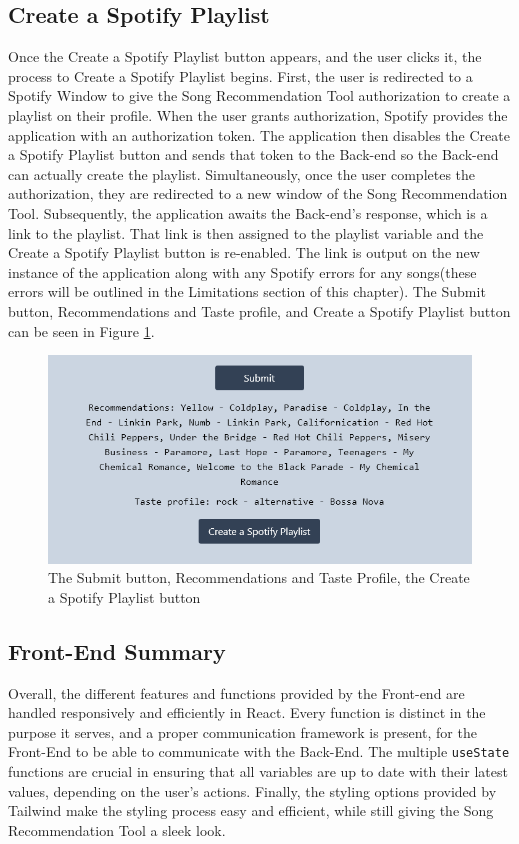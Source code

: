 \documentclass{l4proj}
\begin{document}
\subsection{Create a Spotify Playlist}
Once the Create a Spotify Playlist button appears, and the user clicks it, the process to Create a Spotify Playlist begins. First, the user is redirected to a Spotify Window to give the Song Recommendation Tool authorization to create a playlist on their profile. When the user grants authorization, Spotify provides the application with an authorization token. The application then disables the Create a Spotify Playlist button and sends that token to the Back-end so the Back-end can actually create the playlist. Simultaneously, once the user completes the authorization, they are redirected to a new window of the Song Recommendation Tool. Subsequently, the application awaits the Back-end's response, which is a link to the playlist. That link is then assigned to the playlist variable and the Create a Spotify Playlist button is re-enabled. The link is output on the new instance of the application along with any Spotify errors for any songs(these errors will be outlined in the Limitations section of this chapter). The Submit button, Recommendations and Taste profile, and Create a Spotify Playlist button can be seen in Figure \ref{fig:submit}.
\begin{figure}
    \centering
    \includegraphics[width=1\linewidth]{images/Submit.png}
    \caption{The Submit button, Recommendations and Taste Profile, the Create a Spotify Playlist button}
    \label{fig:submit}
\end{figure}
\subsection{Front-End Summary}
Overall, the different features and functions provided by the Front-end are handled responsively and efficiently in React. Every function is distinct in the purpose it serves, and a proper communication framework is present, for the Front-End to be able to communicate with the Back-End. The multiple \texttt{useState} functions are crucial in ensuring that all variables are up to date with their latest values, depending on the user's actions. Finally, the styling options provided by Tailwind make the styling process easy and efficient, while still giving the Song Recommendation Tool a sleek look.
\end{document}
